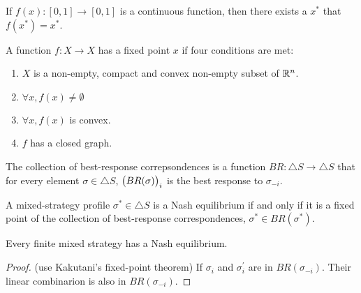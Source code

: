 \begin{theorem}
    If $f(x): [0,1] \rightarrow [0,1]$ is a continuous function, then there exists a $x^*$ that $f(x^*) = x^*$.
\end{theorem}

\begin{theorem}
    A function $f: X \rightarrow X$ has a fixed point $x$ if four conditions are met:
    \begin{enumerate}
        \item $X$ is a non-empty, compact and convex non-empty subset of $\mathbb{R}^n$.
        \item $\forall x, f(x) \neq \emptyset$
        \item $\forall x, f(x)$ is convex.
        \item $f$ has a closed graph.
    \end{enumerate}
\end{theorem}

\begin{definition}
    The collection of best-response correpsondences is a function $BR: \bigtriangleup S \rightarrow \bigtriangleup S$ that for every element $\sigma \in \bigtriangleup S$, $\mleft(BR(\sigma)\mright)_i$ is the best response to $\sigma_{-i}$.
\end{definition}

\begin{theorem}
    A mixed-strategy profile $\sigma^* \in \bigtriangleup S$ is a Nash equilibrium if and only if it is a fixed point of the collection of best-response correspondences, $\sigma^* \in BR(\sigma^*)$.
\end{theorem}

\begin{theorem}
    Every finite mixed strategy has a Nash equilibrium.    
\end{theorem}
\begin{proof}(use Kakutani's fixed-point theorem)
    If $\sigma_i$ and $\sigma_i^{'}$ are in $BR(\sigma_{-i})$. Their linear combinarion is also in $BR(\sigma_{-i})$.
\end{proof}














